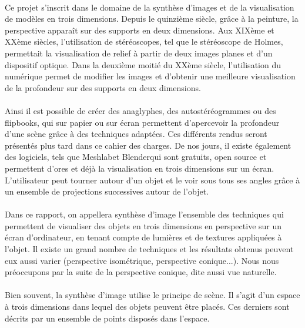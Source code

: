 \paragraph{}
	Ce projet s’inscrit dans le domaine de la synthèse d’images et de la visualisation de modèles en trois dimensions. Depuis le quinzième siècle, grâce à la peinture, la perspective apparaît sur des supports en deux dimensions\cite{wiki3D}. Aux XIXème et XXème siècles, l’utilisation de stéréoscopes\cite{stereoscope}, tel que le stéréoscope de Holmes, permettait la visualisation de relief à partir de deux images planes et d’un dispositif optique. Dans la deuxième moitié du XXème siècle, l’utilisation du numérique permet de modifier les images et d’obtenir une meilleure visualisation de la profondeur sur des supports en deux dimensions. 

\paragraph{}	
	Ainsi il est possible de créer des anaglyphes, des autostéréogrammes ou des flipbooks, qui sur papier ou sur écran permettent d’apercevoir la profondeur d’une scène grâce à des techniques adaptées. Ces différents rendus seront présentés plus tard dans ce cahier des charges. De nos jours, il existe également des logiciels, tels que Meshlab\footnotemark {}et Blender\footnotemark qui sont gratuits, open source et permettent d’ores et déjà la visualisation en trois dimensions sur un écran. L’utilisateur peut tourner autour d’un objet et le voir sous tous ses angles grâce à un ensemble de projections successives autour de l’objet.



\paragraph{}
	Dans ce rapport, on appellera synthèse d’image l'ensemble des techniques qui permettent de visualiser des objets en trois dimensions en perspective sur un écran d'ordinateur, en tenant compte de lumières et de textures appliquées à l'objet. Il existe un grand nombre de techniques et les résultats obtenus peuvent eux aussi varier (perspective isométrique, perspective conique...). Nous nous préoccupons par la suite de la perspective conique, dite aussi vue naturelle. 

\paragraph{}
	Bien souvent, la synthèse d'image utilise le principe de scène. Il s'agit d'un espace à trois dimensions dans lequel des objets peuvent être placés. Ces derniers sont décrits par un ensemble de points disposés dans l'espace.

